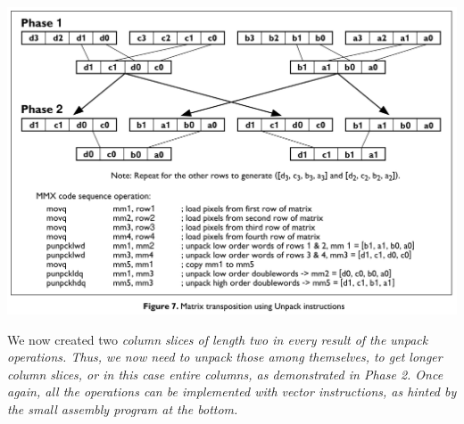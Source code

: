 \documentclass[../../main.tex]{subfiles}
\begin{document}
\begin{description}
    \includegraphics[width=\textwidth]{Chapters/07/transpose.png}

    We now created two \em column slices \em of length two in every result of the unpack operations. Thus, we now need to unpack those among themselves, to get longer column slices, or in this case entire columns, as demonstrated in \em Phase 2\em .
    Once again, all the operations can be implemented with vector instructions, as hinted by the small assembly program at the bottom.
\end{description}
\end{document}
